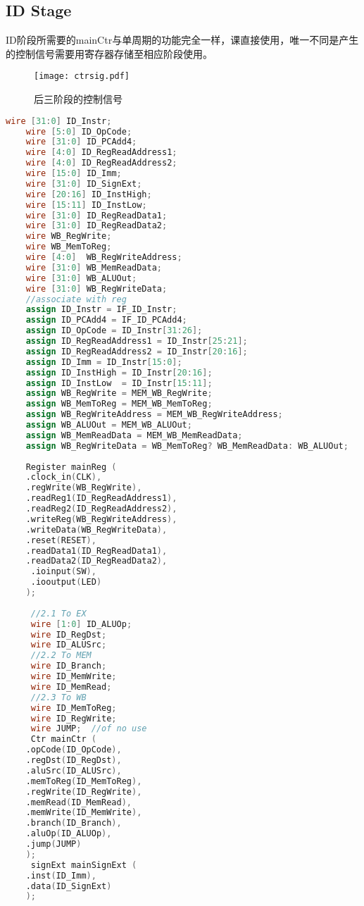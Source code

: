 \documentclass[a4paper]{article}
\begin{document}
    \subsection{ID Stage}
    ID阶段所需要的mainCtr与单周期的功能完全一样，课直接使用，唯一不同是产生的控制信号需要用寄存器存储至相应阶段使用。
        \begin{figure}[hb]
  \centering
  \texttt{[image: ctrsig.pdf]}
  \caption{后三阶段的控制信号}
\end{figure}
        \begin{lstlisting}[language={Verilog},title={ID.v}] wire [31:0] ID_Instr;
	wire [5:0] ID_OpCode;
	wire [31:0] ID_PCAdd4;
	wire [4:0] ID_RegReadAddress1;
	wire [4:0] ID_RegReadAddress2;
	wire [15:0] ID_Imm;
	wire [31:0] ID_SignExt;
	wire [20:16] ID_InstHigh;
	wire [15:11] ID_InstLow;
	wire [31:0] ID_RegReadData1;
	wire [31:0] ID_RegReadData2;
	wire WB_RegWrite;
	wire WB_MemToReg;
	wire [4:0]  WB_RegWriteAddress;
	wire [31:0] WB_MemReadData;
	wire [31:0] WB_ALUOut;
	wire [31:0] WB_RegWriteData;
	//associate with reg
	assign ID_Instr = IF_ID_Instr;
	assign ID_PCAdd4 = IF_ID_PCAdd4;
	assign ID_OpCode = ID_Instr[31:26];
	assign ID_RegReadAddress1 = ID_Instr[25:21];
	assign ID_RegReadAddress2 = ID_Instr[20:16];
	assign ID_Imm = ID_Instr[15:0];
	assign ID_InstHigh = ID_Instr[20:16];
	assign ID_InstLow  = ID_Instr[15:11];
	assign WB_RegWrite = MEM_WB_RegWrite;
	assign WB_MemToReg = MEM_WB_MemToReg;
	assign WB_RegWriteAddress = MEM_WB_RegWriteAddress;
	assign WB_ALUOut = MEM_WB_ALUOut;
	assign WB_MemReadData = MEM_WB_MemReadData;
	assign WB_RegWriteData = WB_MemToReg? WB_MemReadData: WB_ALUOut;
	
	Register mainReg (
    .clock_in(CLK),
    .regWrite(WB_RegWrite),
    .readReg1(ID_RegReadAddress1),
    .readReg2(ID_RegReadAddress2),
    .writeReg(WB_RegWriteAddress),
    .writeData(WB_RegWriteData),
    .reset(RESET),
    .readData1(ID_RegReadData1),
    .readData2(ID_RegReadData2),
	 .ioinput(SW),
	 .iooutput(LED)
    );
	
	 //2.1 To EX
	 wire [1:0] ID_ALUOp;
	 wire ID_RegDst;
	 wire ID_ALUSrc;
	 //2.2 To MEM
	 wire ID_Branch;
	 wire ID_MemWrite;
	 wire ID_MemRead;
	 //2.3 To WB
	 wire ID_MemToReg;
	 wire ID_RegWrite;
	 wire JUMP;  //of no use
	 Ctr mainCtr (
    .opCode(ID_OpCode),
    .regDst(ID_RegDst),
    .aluSrc(ID_ALUSrc),
    .memToReg(ID_MemToReg),
    .regWrite(ID_RegWrite),
    .memRead(ID_MemRead),
    .memWrite(ID_MemWrite),
    .branch(ID_Branch),
    .aluOp(ID_ALUOp),
    .jump(JUMP)
    );	
	 signExt mainSignExt (
    .inst(ID_Imm),
    .data(ID_SignExt)
    );  \end{lstlisting}
\end{document}

